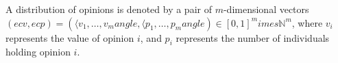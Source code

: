 \documentclass[preview]{standalone}
\begin{document}
\begin{center}
A distribution of opinions is denoted by a pair of $m$-dimensional vectors
$(ec{v},ec{p}) = (\langle v_1,\ldots,v_m 
angle,\langle p_1,\ldots,p_m 
angle) \in [0,1]^m 	imes \mathbb{N}^m$, where $v_i$ represents the value of opinion $i$, and $p_i$ represents the number of individuals holding opinion $i$.
\end{center}
\end{document}
